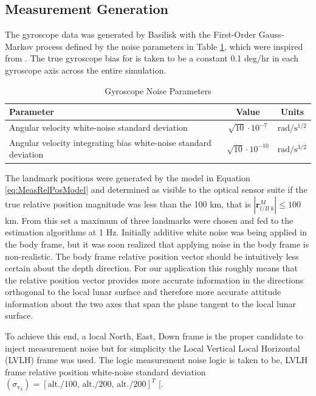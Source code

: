 \documentclass[conf]{new-aiaa}
\newcommand{\vect}[1]{\mathbf{#1}}
\newcommand{\rlB}{\vect{r}^M_{l/B_,k}}
\begin{document}
\subsection{Measurement Generation}
The gyroscope data was generated by Basilisk with the First-Order Gauss-Markov process defined by the noise parameters in Table \ref{tab:gyro_noise_params}, which were inspired from \cite{crassidis2011optimal}. The true gyroscope bias for is taken to be a constant 0.1 deg/hr in each gyroscope axis across the entire simulation.

\begin{table}[h!]
\centering
\begin{tabular}{l c c}
\hline
\textbf{Parameter} & \textbf{Value} & \textbf{Units} \\
\hline
Angular velocity white-noise standard deviation 
& $\sqrt{10}\cdot10^{-7}$ 
& $\mathrm{rad/s^{1/2}}$ \\
Angular velocity integrating bias white-noise standard deviation 
& $\sqrt{10}\cdot10^{-10}$ 
& $\mathrm{rad/s^{3/2}}$ \\
\hline
\end{tabular}
\caption{Gyroscope Noise Parameters}
\label{tab:gyro_noise_params}
\end{table}




The landmark positions were generated by the model in Equation \ref{eq:MeasRelPosModel} and determined as visible to the optical sensor suite if the true relative position magnitude was less than the 100 km, that is $|\rlB| \leq 100$ km. From this set a maximum of three landmarks were chosen and fed to the estimation algorithms at 1 Hz.
Initially additive white noise was being applied in the body frame, but it was soon realized that applying noise in the body frame is non-realistic. The body frame relative position vector should be intuitively less certain about the depth direction. For our application this roughly means that the relative position vector provides more accurate information in the directions orthogonal to the local lunar surface and therefore more accurate attitude information about the two axes that span the plane tangent to the local lunar surface.

To achieve this end, a local North, East, Down frame is the proper candidate to inject measurement noise but for simplicity the Local Vertical Local Horizontal (LVLH) frame was used. The logic measurement noise logic is taken to be, LVLH frame relative position white-noise standard deviation $(\sigma_{\mathrm{v}_k}) = [\text{alt./100, alt./200, alt./200}]^T$ [\text{km]}.
\end{document}
